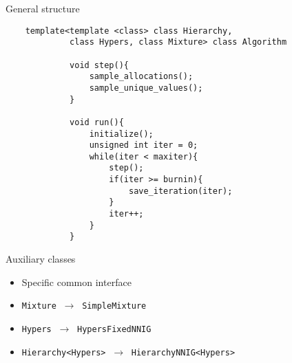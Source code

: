 \begin{frame}[fragile]{General structure} %
	\small
	\begin{verbatim}
    template<template <class> class Hierarchy,
             class Hypers, class Mixture> class Algorithm
            
             void step(){
                 sample_allocations();
                 sample_unique_values();
             }

             void run(){
                 initialize();
                 unsigned int iter = 0;
                 while(iter < maxiter){
                     step();
                     if(iter >= burnin){
                         save_iteration(iter);
                     }
                     iter++;
                 }
             }
	\end{verbatim}
\end{frame}


\begin{frame}{Auxiliary classes} %
	\begin{itemize}
		\item Specific common interface
		\item \texttt{Mixture} $\ \to \ $ \texttt{SimpleMixture}
		\item \texttt{Hypers} $\ \to \ $ \texttt{HypersFixedNNIG}
		\item \texttt{Hierarchy<Hypers>} $\ \to \ $ \texttt{HierarchyNNIG<Hypers>}
	\end{itemize}
\end{frame}


